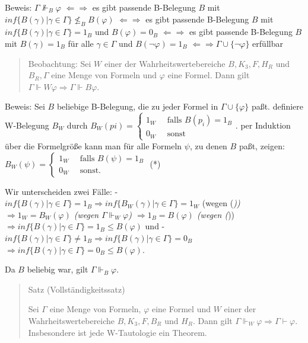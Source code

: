 \documentclass[a4paper]{article}
\begin{document}
\begin{multicols}{3}
  Beweis: $\Gamma\not\Vdash_B\varphi$ $\Leftarrow\Rightarrow$ es gibt
  passende B-Belegung $B$ mit
  $inf\{B(\gamma)|\gamma\in\Gamma\} \not\leq_B B(\varphi)$
  $\Leftarrow\Rightarrow$ es gibt passende B-Belegung $B$ mit
  $inf\{B(\gamma)|\gamma\in\Gamma\}= 1_B$ und $B(\varphi)=0_B$
  $\Leftarrow\Rightarrow$ es gibt passende B-Belegung $B$ mit
  $B(\gamma) = 1_B$ für alle $\gamma\in\Gamma$ und $B(\lnot\varphi) = 1_B$
  $\Leftarrow\Rightarrow \Gamma\cup\{\lnot\varphi\}$ erfüllbar

  \begin{quote}
    Beobachtung: Sei $W$ einer der Wahrheitswertebereiche $B, K_3, F, H_R$
    und $B_R,\Gamma$ eine Menge von Formeln und $\varphi$ eine Formel. Dann
    gilt $\Gamma\Vdash W\varphi\Rightarrow\Gamma\Vdash B\varphi$.
  \end{quote}

  Beweis: Sei $B$ beliebige B-Belegung, die zu jeder Formel in
  $\Gamma\cup\{\varphi\}$ paßt. definiere W-Belegung $B_W$ durch
  $B_W(pi) = \begin{cases} 1_W \quad\text{ falls } B(p_i) = 1_B \\ 0_W \quad\text{ sonst} \end{cases}$.
  per Induktion über die Formelgröße kann man für alle Formeln $\psi$, zu
  denen $B$ paßt, zeigen:
  $B_W(\psi) = \begin{cases} 1_W \quad\text{ falls } B(\psi) = 1_B \\ 0_W \quad\text{ sonst.} \end{cases}$
  (*)

  Wir unterscheiden zwei Fälle: -
  $inf\{B(\gamma)|\gamma\in\Gamma\}= 1_B \Rightarrow inf\{B_W(\gamma)|\gamma\in\Gamma\} = 1_W$
  (wegen (\emph{)) $\Rightarrow 1_W = B_W(\varphi)$ (wegen
    $\Gamma\Vdash_W\varphi$) $\Rightarrow 1_B = B(\varphi)$ (wegen (}))
  $\Rightarrow inf\{B(\gamma)|\gamma\in\Gamma\} = 1_B \leq B(\varphi)$ und
  -
  $inf\{B(\gamma)|\gamma\in\Gamma\} \not= 1_B \Rightarrow inf\{B(\gamma)|\gamma\in\Gamma\}= 0_B$
  $\Rightarrow inf\{B(\gamma)|\gamma\in\Gamma\}= 0_B \leq B(\varphi)$.

  Da $B$ beliebig war, gilt $\Gamma\Vdash_B \varphi$.

  \begin{quote}
    Satz (Vollständigkeitssatz)

    Sei $\Gamma$ eine Menge von Formeln, $\varphi$ eine Formel und $W$ einer
    der Wahrheitswertebereiche $B,K_3 , F, B_R$ und $H_R$. Dann gilt
    $\Gamma\Vdash_W\varphi \Rightarrow \Gamma\vdash\varphi$. Insbesondere
    ist jede W-Tautologie ein Theorem.
  \end{quote}


\end{multicols}
\end{document}
